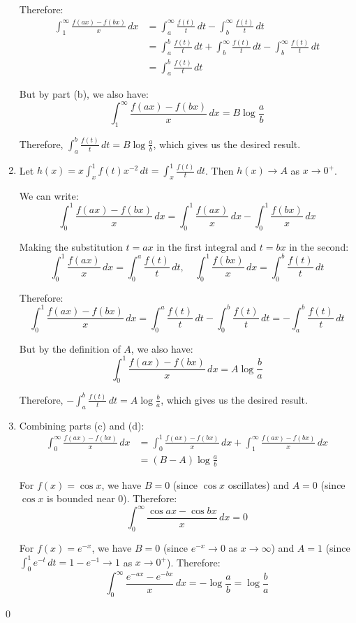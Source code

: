 \begin{enumerate}[label=(\alph*)]
Therefore:
\begin{align*}
\int_{1}^{\infty} \frac{f(ax) - f(bx)}{x} \, dx &= \int_{a}^{\infty} \frac{f(t)}{t} \, dt - \int_{b}^{\infty} \frac{f(t)}{t} \, dt \\
&= \int_{a}^{b} \frac{f(t)}{t} \, dt + \int_{b}^{\infty} \frac{f(t)}{t} \, dt - \int_{b}^{\infty} \frac{f(t)}{t} \, dt \\
&= \int_{a}^{b} \frac{f(t)}{t} \, dt
\end{align*}

But by part (b), we also have:
\[\int_{1}^{\infty} \frac{f(ax) - f(bx)}{x} \, dx = B \log \frac{a}{b}\]

Therefore, $\int_{a}^{b} \frac{f(t)}{t} \, dt = B \log \frac{a}{b}$, which gives us the desired result.

\item Let $h(x) = x \int_{x}^{1} f(t)x^{-2} \, dt = \int_{x}^{1} \frac{f(t)}{t} \, dt$. Then $h(x) \to A$ as $x \to 0^+$.

We can write:
\[\int_{0}^{1} \frac{f(ax) - f(bx)}{x} \, dx = \int_{0}^{1} \frac{f(ax)}{x} \, dx - \int_{0}^{1} \frac{f(bx)}{x} \, dx\]

Making the substitution $t = ax$ in the first integral and $t = bx$ in the second:
\[\int_{0}^{1} \frac{f(ax)}{x} \, dx = \int_{0}^{a} \frac{f(t)}{t} \, dt, \quad \int_{0}^{1} \frac{f(bx)}{x} \, dx = \int_{0}^{b} \frac{f(t)}{t} \, dt\]

Therefore:
\[\int_{0}^{1} \frac{f(ax) - f(bx)}{x} \, dx = \int_{0}^{a} \frac{f(t)}{t} \, dt - \int_{0}^{b} \frac{f(t)}{t} \, dt = -\int_{a}^{b} \frac{f(t)}{t} \, dt\]

But by the definition of $A$, we also have:
\[\int_{0}^{1} \frac{f(ax) - f(bx)}{x} \, dx = A \log \frac{b}{a}\]

Therefore, $-\int_{a}^{b} \frac{f(t)}{t} \, dt = A \log \frac{b}{a}$, which gives us the desired result.

\item Combining parts (c) and (d):
\begin{align*}
\int_{0}^{\infty} \frac{f(ax) - f(bx)}{x} \, dx &= \int_{0}^{1} \frac{f(ax) - f(bx)}{x} \, dx + \int_{1}^{\infty} \frac{f(ax) - f(bx)}{x} \, dx \\
&= (B - A) \log \frac{a}{b}
\end{align*}

For $f(x) = \cos x$, we have $B = 0$ (since $\cos x$ oscillates) and $A = 0$ (since $\cos x$ is bounded near 0). Therefore:
\[\int_{0}^{\infty} \frac{\cos ax - \cos bx}{x} \, dx = 0\]

For $f(x) = e^{-x}$, we have $B = 0$ (since $e^{-x} \to 0$ as $x \to \infty$) and $A = 1$ (since $\int_{0}^{1} e^{-t} \, dt = 1 - e^{-1} \to 1$ as $x \to 0^+$). Therefore:
\[\int_{0}^{\infty} \frac{e^{-ax} - e^{-bx}}{x} \, dx = -\log \frac{a}{b} = \log \frac{b}{a}\]
\end{enumerate}\qed


